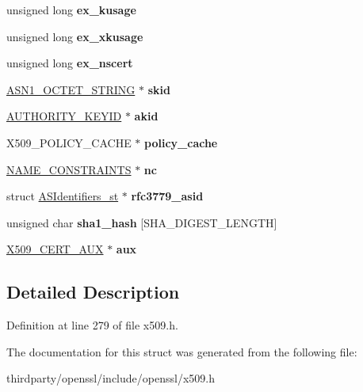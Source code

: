 \begin{DoxyCompactItemize}
\mbox{\label{structx509__st_aa22af4cd664504cf5d8f910bc2dc4caf}} 
unsigned long {\bfseries ex\+\_\+kusage}
\item 
\mbox{\label{structx509__st_a476d2351651a42fae4b5a8cf9d67ae8e}} 
unsigned long {\bfseries ex\+\_\+xkusage}
\item 
\mbox{\label{structx509__st_ae26ccfc73c4ca44fc360d90c894f321c}} 
unsigned long {\bfseries ex\+\_\+nscert}
\item 
\mbox{\label{structx509__st_a6ebe771c246586c77c91f2deca26b84d}} 
\hyperlink{structasn1__string__st}{A\+S\+N1\+\_\+\+O\+C\+T\+E\+T\+\_\+\+S\+T\+R\+I\+NG} $\ast$ {\bfseries skid}
\item 
\mbox{\label{structx509__st_a0e11914f6c1933ca2734bea95f06cf78}} 
\hyperlink{struct_a_u_t_h_o_r_i_t_y___k_e_y_i_d__st}{A\+U\+T\+H\+O\+R\+I\+T\+Y\+\_\+\+K\+E\+Y\+ID} $\ast$ {\bfseries akid}
\item 
\mbox{\label{structx509__st_af85ce8a268304c4850f30343b17c018c}} 
X509\+\_\+\+P\+O\+L\+I\+C\+Y\+\_\+\+C\+A\+C\+HE $\ast$ {\bfseries policy\+\_\+cache}
\item 
\mbox{\label{structx509__st_a1f79b4f8402d962b6cee671e70c9b661}} 
\hyperlink{struct_n_a_m_e___c_o_n_s_t_r_a_i_n_t_s__st}{N\+A\+M\+E\+\_\+\+C\+O\+N\+S\+T\+R\+A\+I\+N\+TS} $\ast$ {\bfseries nc}
\item 
\mbox{\label{structx509__st_a0a127b4d4820f45ad31d8b565c9d6341}} 
struct \hyperlink{struct_a_s_identifiers__st}{A\+S\+Identifiers\+\_\+st} $\ast$ {\bfseries rfc3779\+\_\+asid}
\item 
\mbox{\label{structx509__st_a5f14592600ea066dea895667d98f8614}} 
unsigned char {\bfseries sha1\+\_\+hash} \mbox{[}S\+H\+A\+\_\+\+D\+I\+G\+E\+S\+T\+\_\+\+L\+E\+N\+G\+TH\mbox{]}
\item 
\mbox{\label{structx509__st_aa65a773dc5963a057790ccc63ca0a169}} 
\hyperlink{structx509__cert__aux__st}{X509\+\_\+\+C\+E\+R\+T\+\_\+\+A\+UX} $\ast$ {\bfseries aux}
\end{DoxyCompactItemize}


\subsection{Detailed Description}


Definition at line 279 of file x509.\+h.



The documentation for this struct was generated from the following file\+:\begin{DoxyCompactItemize}
\item 
thirdparty/openssl/include/openssl/x509.\+h\end{DoxyCompactItemize}
